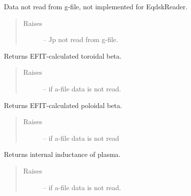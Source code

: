 \documentclass[letterpaper,10pt,english]{sphinxmanual}
\begin{document}
\begin{fulllineitems}
\begin{fulllineitems}
Data not read from g-file, not implemented for EqdskReader.
\begin{quote}\begin{description}
\item[{Raises}] \leavevmode
{} -- 
Jp not read from g-file.

\end{description}\end{quote}

\end{fulllineitems}


\begin{fulllineitems}
\label{eqtools:eqtools.eqdskreader.EqdskReader.getBetaT}
Returns EFIT-calculated toroidal beta.
\begin{quote}\begin{description}
\item[{Raises}] \leavevmode
{} -- 
if a-file data is not read.

\end{description}\end{quote}

\end{fulllineitems}


\begin{fulllineitems}
\label{eqtools:eqtools.eqdskreader.EqdskReader.getBetaP}
Returns EFIT-calculated poloidal beta.
\begin{quote}\begin{description}
\item[{Raises}] \leavevmode
{} -- 
if a-file data is not read

\end{description}\end{quote}

\end{fulllineitems}


\begin{fulllineitems}
\label{eqtools:eqtools.eqdskreader.EqdskReader.getLi}
Returns internal inductance of plasma.
\begin{quote}\begin{description}
\item[{Raises}] \leavevmode
{} -- 
if a-file data is not read.


\end{description}
\end{quote}
\end{fulllineitems}
\end{fulllineitems}
\end{document}

